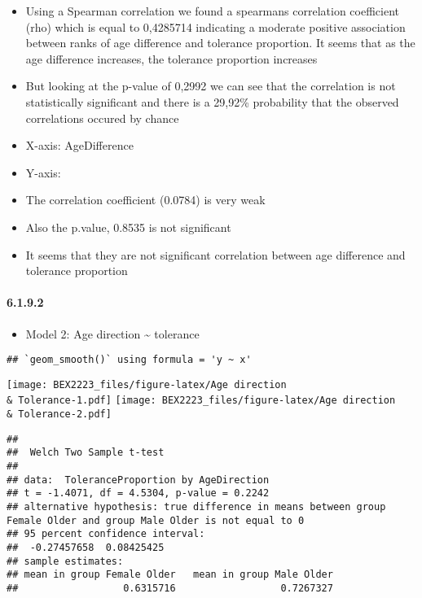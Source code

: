 \documentclass[
]{article}
\providecommand{\tightlist}{%
  \setlength{\itemsep}{0pt}\setlength{\parskip}{0pt}}
\begin{document}
\begin{itemize}
\item
  Using a Spearman correlation we found a spearmans correlation
  coefficient (rho) which is equal to 0,4285714 indicating a moderate
  positive association between ranks of age difference and tolerance
  proportion. It seems that as the age difference increases, the
  tolerance proportion increases
\item
  But looking at the p-value of 0,2992 we can see that the correlation
  is not statistically significant and there is a 29,92\% probability
  that the observed correlations occured by chance
\item
  X-axis: AgeDifference
\item
  Y-axis:
\item
  The correlation coefficient (0.0784) is very weak
\item
  Also the p.value, 0.8535 is not significant
\item
  It seems that they are not significant correlation between age
  difference and tolerance proportion
\end{itemize}

\hypertarget{section-3}{%
\paragraph{6.1.9.2}\label{section-3}}

\begin{itemize}
\tightlist
\item
  Model 2: Age direction \textasciitilde{} tolerance
\end{itemize}

\begin{verbatim}
## `geom_smooth()` using formula = 'y ~ x'
\end{verbatim}

\texttt{[image: BEX2223\_files/figure-latex/Age direction \\\& Tolerance-1.pdf]}
\texttt{[image: BEX2223\_files/figure-latex/Age direction \\\& Tolerance-2.pdf]}

\begin{verbatim}
## 
##  Welch Two Sample t-test
## 
## data:  ToleranceProportion by AgeDirection
## t = -1.4071, df = 4.5304, p-value = 0.2242
## alternative hypothesis: true difference in means between group Female Older and group Male Older is not equal to 0
## 95 percent confidence interval:
##  -0.27457658  0.08425425
## sample estimates:
## mean in group Female Older   mean in group Male Older 
##                  0.6315716                  0.7267327
\end{verbatim}
\end{document}
